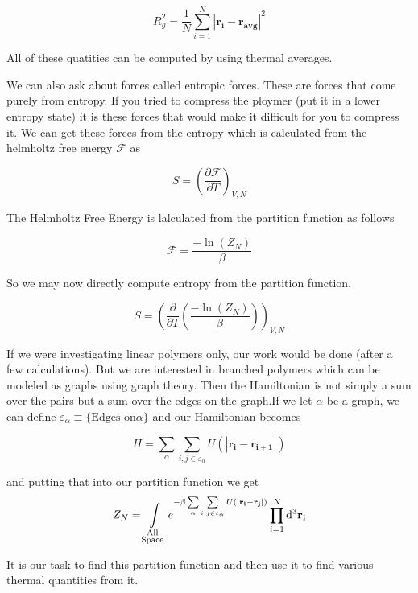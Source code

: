 \documentclass{article}
\begin{document}
\begin{equation}
R_g^2=\frac{1}{N}\sum\limits_{i=1}^N |\mathbf{r_i-r_{avg}}|^2
\end{equation}

All of these quatities can be computed by using thermal averages.

We can also ask about forces called entropic forces. These are forces that come purely from entropy. If you tried to compress the ploymer (put it in a lower entropy state) it is these forces that would make it difficult for you to compress it. We can get these forces from the entropy which is calculated from the helmholtz free energy \(\mathscr{F}\) as

\begin{equation}
S=\left(\frac{\partial \mathscr{F}}{\partial T}\right)_{V,N}
\end{equation}

The Helmholtz Free Energy is lalculated from the partition function as follows

\begin{equation}
\mathscr{F}=\frac{-\ln(Z_N)}{\beta}
\end{equation}

So we may now directly compute entropy from the partition function.

\begin{equation}
S=\left(\frac{\partial}{\partial T}\left(\frac{-\ln(Z_N)}{\beta}\right)\right)_{V,N}
\end{equation}

If we were investigating linear polymers only, our work would be done (after a few calculations). But we are interested in branched polymers which can be modeled as graphs using graph theory. Then the Hamiltonian is not simply a sum over the pairs but a sum over the edges on the graph.If we let \(\alpha\) be a graph, we can define \(\varepsilon_\alpha\equiv \{ \text{Edges on}\alpha\}\) and our Hamiltonian becomes

\begin{equation}
H= \sum\limits_{\alpha} \sum\limits_{i,j \in \varepsilon_\alpha}U(|\mathbf{r_i-r_{i+1}}|)
\end{equation}

and putting that into our partition function we get
\begin{equation}
Z_N=\int\limits_{\substack{\text{All} \\  \text{Space}}} \mathrm\mathrm{e}^{-\beta \sum\limits_{\alpha} \sum\limits_{i,j \in \varepsilon_\alpha}U(|\mathbf{r_i-r_j}|)}\prod\limits_{i=1}^N \mathrm{d}^3\mathbf{r_i}
\end{equation}

It is our task to find this partition function and then use it to find various thermal quantities from it.
\end{document}
